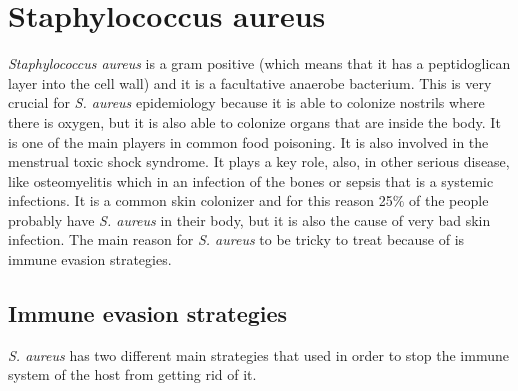 \chapter{Staphylococcus aureus}

\emph{Staphylococcus aureus} is a gram positive (which means that it has a peptidoglican layer into the cell wall) and it is a facultative anaerobe bacterium. This is very crucial for \emph{S. aureus} epidemiology because it is able to colonize nostrils where there is oxygen, but it is also able to colonize organs that are inside the body. It is  one of the main players in common food poisoning. It is also involved in the menstrual toxic shock syndrome. It plays a key role, also, in other serious disease, like osteomyelitis which in an infection of the bones or sepsis that is a systemic infections. 
It is a common skin colonizer and for this reason 25$\%$ of the people probably have \emph{S. aureus} in their body, but it is also the cause of very bad skin infection. 
The main reason for \emph{S. aureus} to be tricky to treat because of is immune evasion strategies.

\section{Immune evasion strategies}

\emph{S. aureus} has two different main strategies that used in order to stop the immune system of the host from getting rid of it. 

